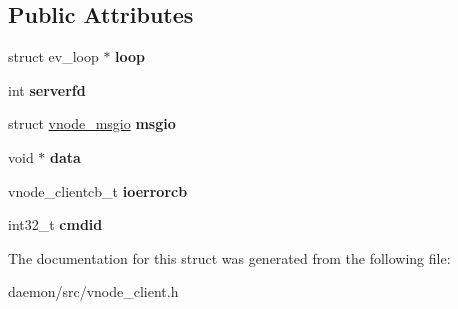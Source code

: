 \subsection*{Public Attributes}
\begin{DoxyCompactItemize}
\item 
\hypertarget{structvnode__client_a516d6119869f5d4ec0e9e015f43bbbb7}{struct ev\+\_\+loop $\ast$ {\bfseries loop}}\label{structvnode__client_a516d6119869f5d4ec0e9e015f43bbbb7}

\item 
\hypertarget{structvnode__client_af06486ff142dc8cde1445f4236fd0323}{int {\bfseries serverfd}}\label{structvnode__client_af06486ff142dc8cde1445f4236fd0323}

\item 
\hypertarget{structvnode__client_a0315374a6e1a7b9236b46f8b8b1f7e8e}{struct \hyperlink{structvnode__msgio}{vnode\+\_\+msgio} {\bfseries msgio}}\label{structvnode__client_a0315374a6e1a7b9236b46f8b8b1f7e8e}

\item 
\hypertarget{structvnode__client_a63f6a2cfe185ea6717e4c500be0ee868}{void $\ast$ {\bfseries data}}\label{structvnode__client_a63f6a2cfe185ea6717e4c500be0ee868}

\item 
\hypertarget{structvnode__client_af24a780b8ff26196ab3c8533ca2dad23}{vnode\+\_\+clientcb\+\_\+t {\bfseries ioerrorcb}}\label{structvnode__client_af24a780b8ff26196ab3c8533ca2dad23}

\item 
\hypertarget{structvnode__client_a4f0516a7eb1be3efa153a647bac98729}{int32\+\_\+t {\bfseries cmdid}}\label{structvnode__client_a4f0516a7eb1be3efa153a647bac98729}

\end{DoxyCompactItemize}


The documentation for this struct was generated from the following file\+:\begin{DoxyCompactItemize}
\item 
daemon/src/vnode\+\_\+client.\+h\end{DoxyCompactItemize}

